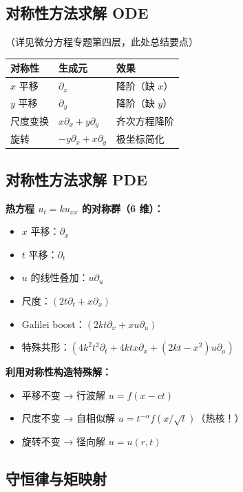 \subsection{对称性方法求解 ODE}

（详见微分方程专题第四层，此处总结要点）

\begin{center}
\begin{tabular}{p{4cm}p{4cm}p{4cm}}
\toprule
\textbf{对称性} & \textbf{生成元} & \textbf{效果} \\
\midrule
$x$ 平移 & $\partial_x$ & 降阶（缺 $x$） \\
$y$ 平移 & $\partial_y$ & 降阶（缺 $y$） \\
尺度变换 & $x\partial_x + y\partial_y$ & 齐次方程降阶 \\
旋转 & $-y\partial_x + x\partial_y$ & 极坐标简化 \\
\bottomrule
\end{tabular}
\end{center}

\subsection{对称性方法求解 PDE}

\textbf{热方程 $u_t = ku_{xx}$ 的对称群（6 维）：}
\begin{itemize}
  \item $x$ 平移：$\partial_x$
  \item $t$ 平移：$\partial_t$
  \item $u$ 的线性叠加：$u\partial_u$
  \item 尺度：$(2t\partial_t + x\partial_x)$
  \item Galilei boost：$(2kt\partial_x + xu\partial_u)$
  \item 特殊共形：$(4k^2t^2\partial_t + 4ktx\partial_x + (2kt - x^2)u\partial_u)$
\end{itemize}

\textbf{利用对称性构造特殊解：}
\begin{itemize}
  \item 平移不变 → 行波解 $u = f(x - ct)$
  \item 尺度不变 → 自相似解 $u = t^{-\alpha}f(x/\sqrt{t})$（热核！）
  \item 旋转不变 → 径向解 $u = u(r, t)$
\end{itemize}

\subsection{守恒律与矩映射}

